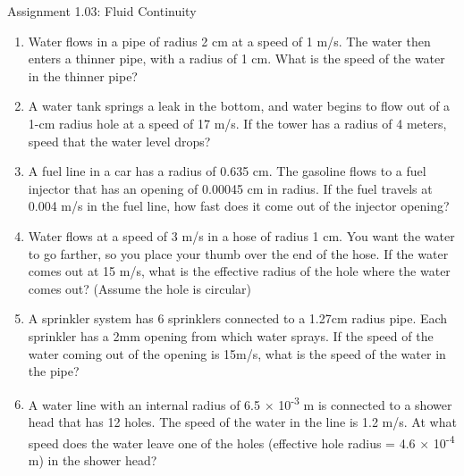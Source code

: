 \documentclass[letterpaper, 11pt]{article}
\begin{document}
	

	
\begin{center}Assignment 1.03: Fluid Continuity
\end{center}

\begin{enumerate}
\item Water flows in a pipe of radius 2 cm at a speed of 1 m/s.  The water then enters a thinner pipe, with a radius of 1 cm.  What is the speed of the water in the thinner pipe?
\vspace{1.2in}

\item A water tank springs a leak in the bottom, and water begins to flow out of a 1-cm radius hole at a speed of 17 m/s.  If the tower has a radius of 4 meters, speed that the water level drops?
\vspace{1.2in}

\item A fuel line in a car has a radius of 0.635 cm.  The gasoline flows to a fuel injector that has an opening of 0.00045 cm in radius.  If the fuel travels at 0.004 m/s in the fuel line, how fast does it come out of the injector opening?
\vspace{1.2in}

\item Water flows at a speed of 3 m/s in a hose of radius 1 cm.  You want the water to go farther, so you place your thumb over the end of the hose.  If the water comes out at 15 m/s, what is the effective radius of the hole where the water comes out?  (Assume the hole is circular)
\vspace{1.2in}

\item A sprinkler system has 6 sprinklers connected to a 1.27cm radius pipe.  Each sprinkler has a 2mm opening from which water sprays.  If the speed of the water coming out of the opening is 15m/s, what is the speed of the water in the pipe?  
\vspace{1.2in}

\item A water line with an internal radius of 6.5 × 10\textsuperscript{-3} m is connected to a shower head that has 12 holes. The speed of the water in the line is 1.2 m/s.  At what speed does the water leave one of the holes (effective hole radius = 4.6 × 10\textsuperscript{-4} m) in the shower head? 
\vspace{1.2in}


\end{enumerate}
\end{document}
